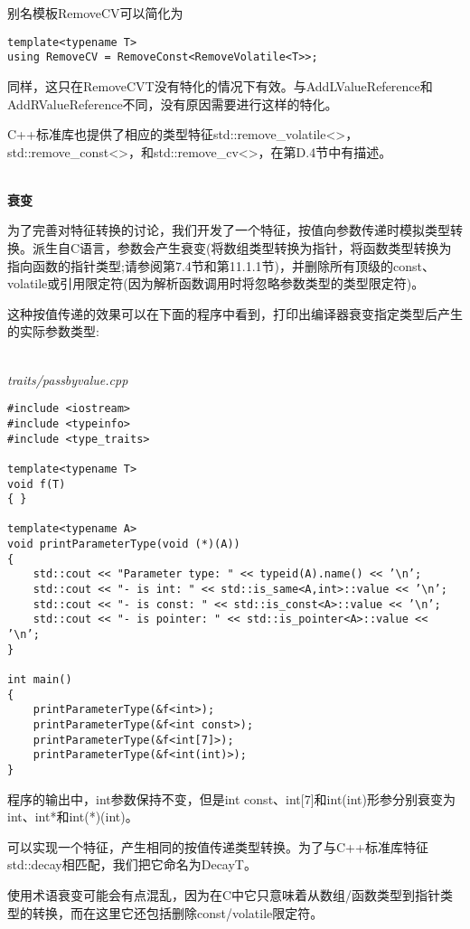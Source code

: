 别名模板RemoveCV可以简化为

\begin{lstlisting}[style=styleCXX]
template<typename T>
using RemoveCV = RemoveConst<RemoveVolatile<T>>;
\end{lstlisting}

同样，这只在RemoveCVT没有特化的情况下有效。与AddLValueReference和AddRValueReference不同，没有原因需要进行这样的特化。

C++标准库也提供了相应的类型特征std::remove\_volatile<>， std::remove\_const<>，和std::remove\_cv<>，在第D.4节中有描述。

\hspace*{\fill} \\ %
\noindent
\textbf{衰变}

为了完善对特征转换的讨论，我们开发了一个特征，按值向参数传递时模拟类型转换。派生自C语言，参数会产生衰变(将数组类型转换为指针，将函数类型转换为指向函数的指针类型;请参阅第7.4节和第11.1.1节)，并删除所有顶级的const、volatile或引用限定符(因为解析函数调用时将忽略参数类型的类型限定符)。

这种按值传递的效果可以在下面的程序中看到，打印出编译器衰变指定类型后产生的实际参数类型:

\hspace*{\fill} \\ %
\noindent
\textit{traits/passbyvalue.cpp}
\begin{lstlisting}[style=styleCXX]
#include <iostream>
#include <typeinfo>
#include <type_traits>

template<typename T>
void f(T)
{ }

template<typename A>
void printParameterType(void (*)(A))
{
	std::cout << "Parameter type: " << typeid(A).name() << ’\n’;
	std::cout << "- is int: " << std::is_same<A,int>::value << ’\n’;
	std::cout << "- is const: " << std::is_const<A>::value << ’\n’;
	std::cout << "- is pointer: " << std::is_pointer<A>::value << ’\n’;
}

int main()
{
	printParameterType(&f<int>);
	printParameterType(&f<int const>);
	printParameterType(&f<int[7]>);
	printParameterType(&f<int(int)>);
}
\end{lstlisting}

程序的输出中，int参数保持不变，但是int const、int[7]和int(int)形参分别衰变为int、int*和int(*)(int)。

可以实现一个特征，产生相同的按值传递类型转换。为了与C++标准库特征std::decay相匹配，我们把它命名为DecayT。

\begin{tcolorbox}[colback=webgreen!5!white,colframe=webgreen!75!black]
\hspace*{0.75cm}使用术语衰变可能会有点混乱，因为在C中它只意味着从数组/函数类型到指针类型的转换，而在这里它还包括删除const/volatile限定符。
\end{tcolorbox}

